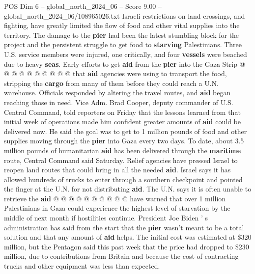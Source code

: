 \begin{textsample}{POS Dim 6 – global\_north\_2024\_06 – Score 9.00 – global\_north\_2024\_06/108965026.txt}
Israeli restrictions on land crossings, and fighting, have greatly limited the flow of food and other vital supplies into the territory.
The damage to the \textbf{pier} had been the latest stumbling block for the project and the persistent struggle to get food to \textbf{starving} Palestinians.
Three U.S. service members were injured, one critically, and four \textbf{vessels} were beached due to heavy \textbf{seas}.
Early efforts to get \textbf{aid} from the \textbf{pier} into the Gaza Strip @ @ @ @ @ @ @ @ @ @ that \textbf{aid} agencies were using to transport the food, stripping the \textbf{cargo} from many of them before they could reach a U.N. warehouse.
Officials responded by altering the travel routes, and \textbf{aid} began reaching those in need.
Vice Adm.
Brad Cooper, deputy commander of U.S.
Central Command, told reporters on Friday that the lessons learned from that initial week of operations made him confident greater amounts of \textbf{aid} could be delivered now.
He said the goal was to get to 1 million pounds of food and other supplies moving through the \textbf{pier} into Gaza every two days.
To date, about 3.5 million pounds of humanitarian \textbf{aid} has been delivered through the \textbf{maritime} route, Central Command said Saturday.
Relief agencies have pressed Israel to reopen land routes that could bring in all the needed \textbf{aid}.
Israel says it has allowed hundreds of trucks to enter through a southern checkpoint and pointed the finger at the U.N. for not distributing \textbf{aid}.
The U.N. says it is often unable to retrieve the \textbf{aid} @ @ @ @ @ @ @ @ @ @ have warned that over 1 million Palestinians in Gaza could experience the highest level of starvation by the middle of next month if hostilities continue.
President Joe Biden ' s administration has said from the start that the \textbf{pier} wasn't meant to be a total solution and that any amount of \textbf{aid} helps.
The initial cost was estimated at \$320 million, but the Pentagon said this past week that the price had dropped to \$230 million, due to contributions from Britain and because the cost of contracting trucks and other equipment was less than expected.

\end{textsample}

